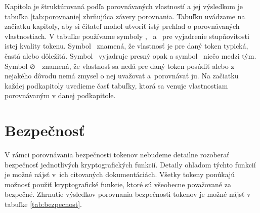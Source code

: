 Kapitola je štruktúrovaná podľa porovnávaných vlastností a jej výsledkom je tabuľka \ref{tab:porovnanie} zhrňujúca závery porovnania. Tabuľku uvádzame na začiatku kapitoly, aby si čitateľ mohol utvoriť istý prehľad o porovnávaných vlastnostiach. V tabuľke používame symboly \CIRCLE, \LEFTcircle ~a \Circle ~pre vyjadrenie stupňovitosti istej kvality tokenu. Symbol \CIRCLE ~znamená, že vlastnosť je pre daný token typická, častá alebo dôležitá. Symbol \Circle ~vyjadruje presný opak a symbol \LEFTcircle ~niečo medzi tým. Symbol $\varoslash$ ~znamená, že vlastnosť sa nedá pre daný token posúdiť alebo z nejakého dôvodu nemá zmysel o nej uvažovať a~porovnávať ju. Na začiatku každej podkapitoly uvedieme časť tabuľky, ktorá sa venuje vlastnostiam porovnávaným v danej podkapitole.

\section{Bezpečnosť}

V rámci porovnávania bezpečnosti tokenov nebudeme detailne rozoberať bezpečnosť jednotlivých kryptografických funkcií. Detaily ohľadom týchto funkcií je možné nájsť v~ich citovaných dokumentáciách. Všetky tokeny ponúkajú možnosť použiť kryptografické funkcie, ktoré sú všeobecne považované za bezpečné. Zhrnutie výsledkov porovnania bezpečnosti tokenov je možné nájsť v tabuľke \ref{tab:bezpecnost}.

\begin{table}[H]
  \begin{center}
    \caption{Bezpečnosť tokenov}
    \label{tab:bezpecnost} %

  \end{center}
\end{table}

